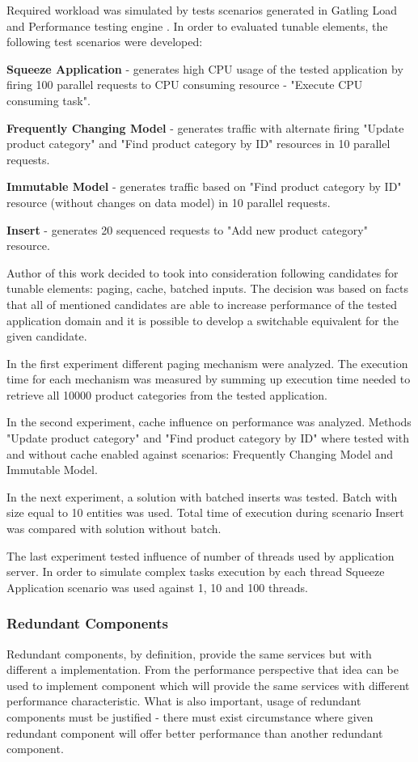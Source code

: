 \documentclass[12pt,a4paper]{article}
\let\tempone\itemize
\let\temptwo\enditemize
\renewenvironment{itemize}{\tempone\addtolength{\itemsep}{-0.4\baselineskip}}{\temptwo}
\begin{document}
Required workload was simulated by tests scenarios generated in Gatling Load and Performance testing engine \cite{gatling}. In order to evaluated tunable elements, the following test scenarios were developed:
\begin{itemize}
\item \textbf{Squeeze Application} - generates high CPU usage of the tested application by firing 100 parallel requests to CPU consuming resource - "Execute CPU consuming task". 
\item \textbf{Frequently Changing Model} - generates traffic with alternate firing  "Update product category" and "Find product category by ID" resources in 10 parallel requests.
\item \textbf{Immutable Model} - generates traffic based on "Find product category by ID" resource (without changes on data model) in 10 parallel requests.
\item \textbf{Insert} - generates 20 sequenced requests to "Add new product category" resource. 
\end{itemize}

Author of this work decided to took into consideration following candidates for tunable elements: paging, cache, batched inputs. The decision was based on facts that all of mentioned candidates are able to increase performance of the  tested application domain and it is possible to develop a switchable equivalent for the given candidate. 

In the first experiment different paging mechanism were analyzed. The execution time for each mechanism was measured by summing up execution time needed to retrieve all 10000 product categories from the tested application.   

In the second experiment, cache influence on performance was analyzed. Methods "Update product category" and "Find product category by ID" where tested with and without cache enabled against scenarios: Frequently Changing Model and    Immutable Model. 

In the next experiment, a solution with batched inserts was tested. Batch with size equal to 10 entities was used. Total time of execution during scenario Insert was compared with solution without batch. 

The last experiment tested influence of number of threads used by application server. In order to simulate complex tasks execution by each thread Squeeze Application scenario was used against 1, 10 and 100 threads. 

\subsubsection{Redundant Components}
Redundant components, by definition, provide the same services but with different a implementation. From the performance perspective that idea can be used to implement component which will provide the same services with different performance characteristic. What is also important, usage of redundant components must be justified - there must exist circumstance where given redundant component will offer better performance than another redundant component. 
\end{document}
